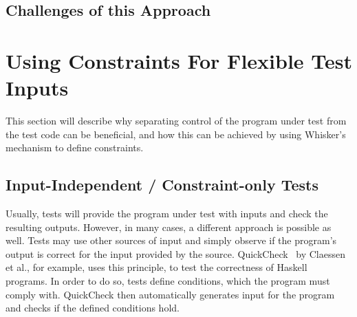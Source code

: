 \section{Challenges of this Approach}

%
%

\chapter{Using Constraints For Flexible Test Inputs}
\label{cha:using_constraints_to_enable_flexible_test_inputs}

This section will describe why separating control of the program under test from the test code can be beneficial,
and how this can be achieved by using Whisker's  mechanism to define constraints.

\section{Input-Independent / Constraint-only Tests}

Usually, tests will provide the program under test with inputs and check the resulting outputs.
However, in many cases, a different approach is possible as well.
Tests may use other sources of input and simply observe if the program's output is correct for the input provided by the source.
QuickCheck~\cite{quickcheck} by Claessen et al., for example, uses this principle, to test the correctness of Haskell programs.
In order to do so, tests define conditions, which the program must comply with.
QuickCheck then automatically generates input for the program and checks if the defined conditions hold.
\parspace

